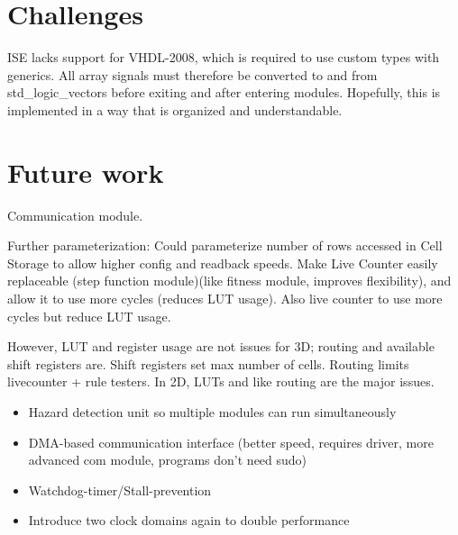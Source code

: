 
\section{Challenges}
\label{sec:challenges}

\TODO

ISE lacks support for VHDL-2008, which is required to use custom types with generics.
All array signals must therefore be converted to and from std\_logic\_vectors before exiting and after entering modules.
Hopefully, this is implemented in a way that is organized and understandable.

\TODO


\section{Future work}

Communication module.

\TODO

Further parameterization:
Could parameterize number of rows accessed in Cell Storage to allow higher config and readback speeds.
Make Live Counter easily replaceable (step function module)(like fitness module, improves flexibility), and allow it to use more cycles (reduces LUT usage).
Also live counter to use more cycles but reduce LUT usage.

However, LUT and register usage are not issues for 3D; routing and available shift registers are.
Shift registers set max number of cells.
Routing limits livecounter + rule testers.
In 2D, LUTs and like routing are the major issues.

\begin{itemize}
    \item Hazard detection unit so multiple modules can run simultaneously
    \item DMA-based communication interface (better speed, requires driver, more advanced com module, programs don't need sudo)
    \item Watchdog-timer/Stall-prevention
    \item Introduce two clock domains again to double performance
\end{itemize}



